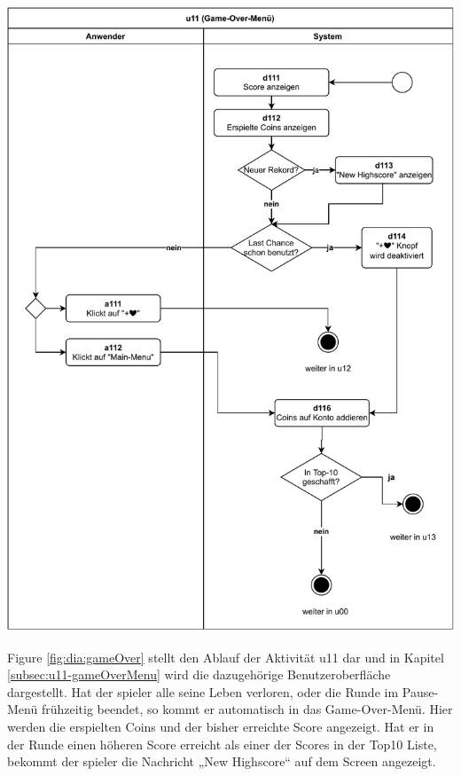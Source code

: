\includegraphics[width=\linewidth]{diagramme/pdf/UML-Activity-u11.pdf}
\label{fig:dia:gameOver}
\vspace*{0.5cm}

Figure \ref{fig:dia:gameOver} stellt den Ablauf der Aktivität u11 dar und in Kapitel \ref{subsec:u11-gameOverMenu} wird die dazugehörige Benutzeroberfläche dargestellt.
Hat der \gls{spieler} alle seine Leben verloren, oder die Runde im Pause-Menü frühzeitig beendet, so kommt er automatisch in das Game-Over-Menü. Hier werden die erspielten Coins und der bisher erreichte Score angezeigt. Hat er in der Runde einen höheren Score erreicht als einer der Scores in der \gls{Top10} Liste, bekommt der \gls{spieler} die Nachricht „New Highscore“ auf dem Screen angezeigt.

\vspace{1em}

